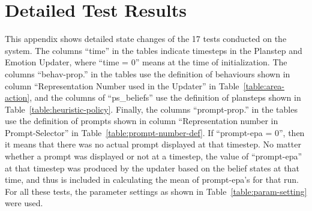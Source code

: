 
\chapter{Detailed Test Results}
\label{chap:appendix}

This appendix shows detailed state changes of the 17 tests conducted on the system. The columns ``time'' in the tables indicate timesteps in the Planstep and Emotion Updater, where ``time = 0'' means at the time of initialization. The columns ``behav-prop.'' in the tables use the definition of behaviours shown in column ``Representation Number used in the Updater'' in Table~\ref{table:area-action}, and the columns of ``ps\_beliefs'' use the definition of plansteps shown in Table~\ref{table:heuristic-policy}. Finally, the columns ``prompt-prop.'' in the tables use the definition of prompts shown in column ``Representation number in Prompt-Selector'' in Table~\ref{table:prompt-number-def}. If ``prompt-epa = 0'', then it means that there was no actual prompt displayed at that timestep. No matter whether a prompt was displayed or not at a timestep, the value of ``prompt-epa'' at that timestep was produced by the updater based on the belief states at that time, and thus is included in calculating the mean of prompt-epa's for that run. For all these tests, the parameter settings as shown in Table~\ref{table:param-setting} were used.




